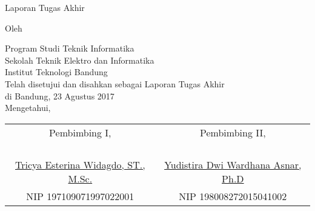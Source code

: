\clearpage
\pagestyle{empty}

\begin{center}
\smallskip

    \Large \bfseries \MakeUppercase{\thetitle}
    \vfill

    \Large Laporan Tugas Akhir
    \vfill

    \large Oleh

    \Large \theauthor

    \large Program Studi Teknik Informatika \\
    \normalsize \normalfont
    Sekolah Teknik Elektro dan Informatika \\
    Institut Teknologi Bandung \\

    \vfill
    \normalsize \normalfont
    Telah disetujui dan disahkan sebagai Laporan Tugas Akhir \\ di Bandung, 23 Agustus 2017 \\
    Mengetahui,

    \vfill
    \setlength{\tabcolsep}{12pt}
    \begin{tabular}{c@{\hskip 0.5in}c}
        Pembimbing I, & Pembimbing II, \\
        & \\
        & \\
        & \\
        & \\
        \underline{Tricya Esterina Widagdo, ST., M.Sc.} & \underline{Yudistira Dwi Wardhana Asnar, Ph.D} \\
        NIP 197109071997022001 & NIP 198008272015041002 \\
    \end{tabular}

\end{center}
\clearpage
